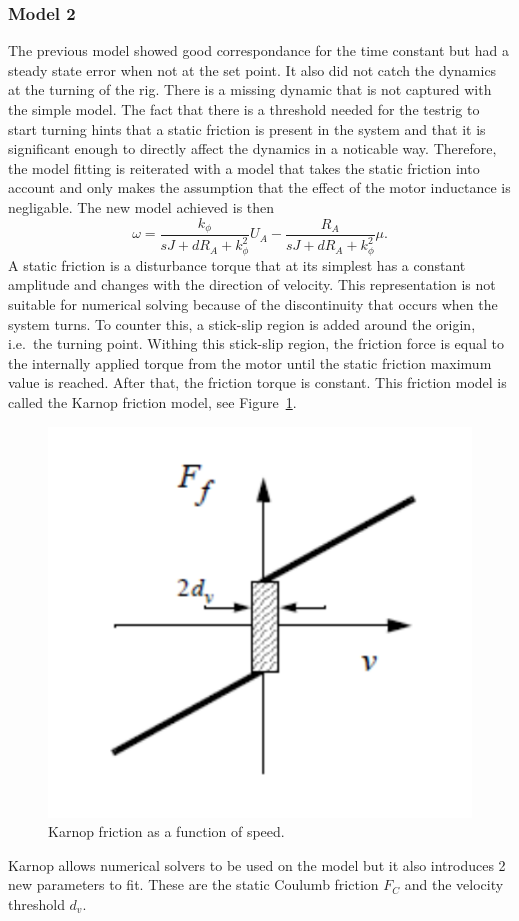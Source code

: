 \subsubsection{Model 2}
The previous model showed good correspondance for the time constant but had a
steady state error when not at the set point. It also did not catch the dynamics
at the turning of the rig. There is a missing dynamic that is not captured with
the simple model. The fact that there is a threshold needed for the testrig to
start turning hints that a static friction is present in the system and that it
is significant enough to directly affect the dynamics in a noticable way.
Therefore, the model fitting is reiterated with a model that takes the static
friction into account and only makes the assumption that the effect of the motor
inductance is negligable. The new model achieved is then
\begin{equation} \label{eq:model2}
    \omega = \frac {k_{\phi}} {sJ + d R_A + k_{\phi}^2} U_A -
    \frac {R_A} {sJ + d R_A + k_{\phi}^2} \mu.
\end{equation}
A static friction is a disturbance torque that at its simplest has a constant
amplitude and changes with the direction of velocity. This representation is not
suitable for numerical solving because of the discontinuity that occurs when the
system turns. To counter this, a stick-slip region is added around the origin,
i.e.\ the turning point. Withing this stick-slip region, the friction force is
equal to the internally applied torque from the motor until the static friction
maximum value is reached. After that, the friction torque is constant. This
friction model is called the Karnop friction model, see Figure~\ref{fig:karnop}.
\begin{figure}[H]
    \centering
    \includegraphics[width=\textwidth]{./img/testrig_karnop.png}
    \caption{Karnop friction as a function of speed.}\label{fig:karnop}
\end{figure}
Karnop allows numerical solvers to be used on the model but it also introduces 2 new
parameters to fit. These are the static Coulumb friction $F_C$ and the velocity
threshold $d_v$.

